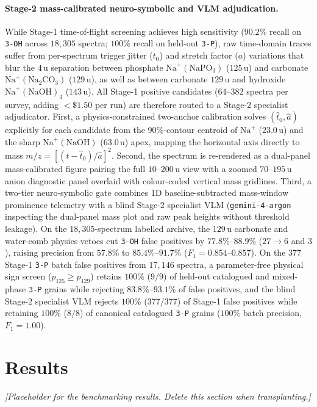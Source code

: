 \documentclass[twocolumn,a4paper,10pt]{article}
\begin{document}
\paragraph{Stage-2 mass-calibrated neuro-symbolic and VLM adjudication.}
While Stage-1 time-of-flight screening achieves high sensitivity ($90.2\%$
recall on \texttt{3-OH} across $18{,}305$ spectra; $100\%$ recall on held-out
\texttt{3-P}), raw time-domain traces suffer from per-spectrum trigger jitter
($t_0$) and stretch factor ($a$) variations that blur the $4$\,u separation
between phosphate $\text{Na}^+(\text{NaPO}_3)$ ($125$\,u) and carbonate
$\text{Na}^+(\text{Na}_2\text{CO}_3)$ ($129$\,u), as well as between carbonate
$129$\,u and hydroxide $\text{Na}^+(\text{NaOH})_3$ ($143$\,u). All Stage-1
positive candidates ($64$--$382$ spectra per survey, adding $<\$1.50$ per
run) are therefore routed to a Stage-2 specialist adjudicator. First, a
physics-constrained two-anchor calibration solves $(\hat{t}_0, \hat{a})$
explicitly for each candidate from the 90\%-contour centroid of $\text{Na}^+$
($23.0$\,u) and the sharp $\text{Na}^+(\text{NaOH})$ ($63.0$\,u) apex,
mapping the horizontal axis directly to mass $m/z = [(t - \hat{t}_0)/\hat{a}]^2$.
Second, the spectrum is re-rendered as a dual-panel mass-calibrated figure
pairing the full $10$--$200$\,u view with a zoomed $70$--$195$\,u anion
diagnostic panel overlaid with colour-coded vertical mass gridlines. Third, a
two-tier neuro-symbolic gate combines 1D baseline-subtracted mass-window
prominence telemetry with a blind Stage-2 specialist VLM (\texttt{gemini-4-argon}
inspecting the dual-panel mass plot and raw peak heights without threshold
leakage). On the $18{,}305$-spectrum labelled archive, the $129$\,u carbonate
and water-comb physics vetoes cut \texttt{3-OH} false positives by $77.8\%$--$88.9\%$
($27 \rightarrow 6$ and $3$), raising precision from $57.8\%$ to $85.4\%$--$91.7\%$
($F_1 = 0.854$--$0.857$). On the $377$ Stage-1 \texttt{3-P} batch false
positives from $17{,}146$ spectra, a parameter-free physical sign screen
($p_{125} \ge p_{129}$) retains $100\%$ ($9/9$) of held-out catalogued and
mixed-phase \texttt{3-P} grains while rejecting $83.8\%$--$93.1\%$ of false
positives, and the blind Stage-2 specialist VLM rejects $100\%$ ($377/377$) of
Stage-1 false positives while retaining $100\%$ ($8/8$) of canonical catalogued
\texttt{3-P} grains ($100\%$ batch precision, $F_1 = 1.00$).


\section{Results}
\label{sec:results}

\textit{[Placeholder for the benchmarking results. Delete this section when
transplanting.]}
\end{document}
